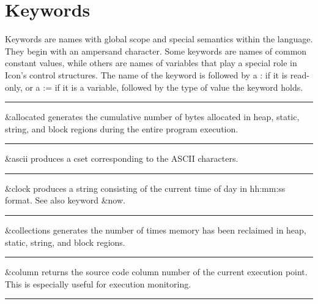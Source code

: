 \section{Keywords}

Keywords are names with global scope and special semantics within
the language. They begin with an ampersand character. Some keywords are names of
common constant values, while others are names of variables that play a special
role in Icon's control structures. The
name of the keyword is followed by a : if it is read-only, or a := if it is a
variable, followed by the type of value the keyword holds.

\bigskip\hrule\vspace{0.1cm}

\noindent
{}\textsf{\&allocated} generates the cumulative number
of bytes allocated in heap, static, string, and block regions during
the entire program execution.

\bigskip\hrule\vspace{0.1cm}

\noindent
{}\textsf{\&ascii} produces a cset corresponding to
the ASCII characters.

\bigskip\hrule\vspace{0.1cm}

\noindent
\textsf{\&clock} produces a string consisting of the current
time of day in hh:mm:ss format.
See also keyword \textsf{\&now}.

\bigskip\hrule\vspace{0.1cm}

\noindent
{}\textsf{\&collections} generates the number of
times memory has been reclaimed in heap, static, string, and block
regions.

\bigskip\hrule\vspace{0.1cm}

\noindent
\textsf{\&column} returns the source code
column number of the current execution point. This
is especially useful for execution monitoring.

\bigskip\hrule\vspace{0.1cm}

